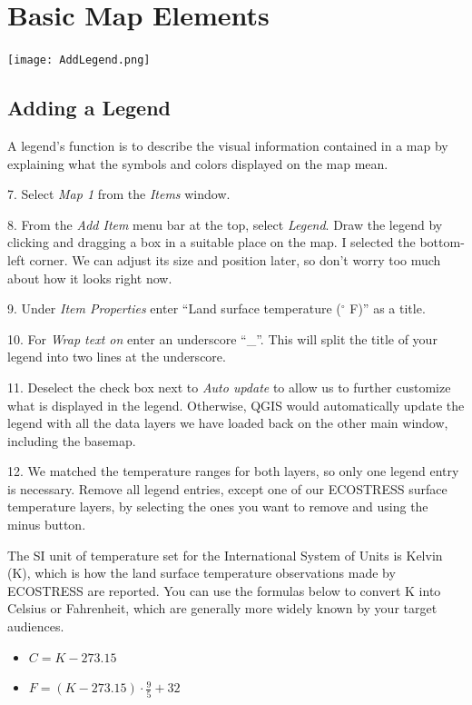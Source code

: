 \documentclass[oneside,a4paper,11pt,explicit]{book}
\begin{document}
\section{Basic Map Elements}

\centerline{\texttt{[image: AddLegend.png]}}

\subsection{Adding a Legend}

A legend's function is to describe the visual information contained in a map by explaining what the symbols and colors displayed on the map mean.

\vspace{.5em}

7. Select \textit{Map 1} from the \textit{Items} window.

8. From the \textit{Add Item} menu bar at the top, select \textit{Legend}. Draw the legend by clicking and dragging a box in a suitable place on the map. I selected the bottom-left corner. We can adjust its size and position later, so don't worry too much about how it looks right now.

9. Under \textit{Item Properties} enter ``Land surface temperature ($^{\circ}$ F)'' as a title.

10. For \textit{Wrap text on} enter an underscore ``\_''. This will split the title of your legend into two lines at the underscore. 

11. Deselect the check box next to \textit{Auto update} to allow us to further customize what is displayed in the legend. Otherwise, QGIS would automatically update the legend with all the data layers we have loaded back on the other main window, including the basemap.

12. We matched the temperature ranges for both layers, so only one legend entry is necessary. Remove all legend entries, except one of our ECOSTRESS surface temperature layers, by selecting the ones you want to remove and using the minus button. 

The SI unit of temperature set for the International System of Units is Kelvin (K), which is how the land surface temperature observations made by ECOSTRESS are reported. You can use the formulas below to convert K into Celsius or Fahrenheit, which are generally more widely known by your target audiences. 
\begin{itemize}
	\item $C = K - 273.15$
	\item $F = (K - 273.15) \cdot \frac{9}{5} + 32$
\end{itemize}
\end{document}

